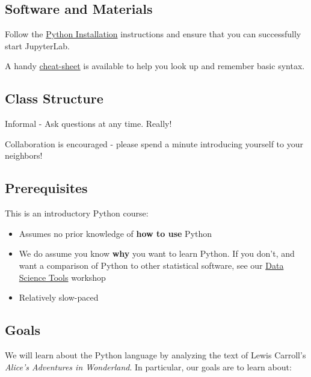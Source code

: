 \documentclass[]{book}
\providecommand{\tightlist}{%
  \setlength{\itemsep}{0pt}\setlength{\parskip}{0pt}}
\begin{document}
\hypertarget{software-and-materials-4}{%
\subsection{Software and Materials}\label{software-and-materials-4}}

Follow the \href{./PythonInstall.html}{Python Installation} instructions and ensure that you can successfully start JupyterLab.

A handy \href{Python/PythonIntro/python-cheat-sheet-basic.pdf}{cheat-sheet} is available to help you look up and remember basic syntax.

\hypertarget{class-structure-4}{%
\subsection{Class Structure}\label{class-structure-4}}

Informal - Ask questions at any time. Really!

Collaboration is encouraged - please spend a minute introducing yourself to your neighbors!

\hypertarget{prerequisites-4}{%
\subsection{Prerequisites}\label{prerequisites-4}}

This is an introductory Python course:

\begin{itemize}
\tightlist
\item
  Assumes no prior knowledge of \textbf{how to use} Python
\item
  We do assume you know \textbf{why} you want to learn Python. If you don't, and want a comparison of Python to other statistical software, see our \href{./DataScienceTools.html}{Data Science Tools} workshop
\item
  Relatively slow-paced
\end{itemize}

\hypertarget{goals-3}{%
\subsection{Goals}\label{goals-3}}

We will learn about the Python language by analyzing the text of Lewis Carroll's \emph{Alice's Adventures in Wonderland}.
In particular, our goals are to learn about:
\end{document}
